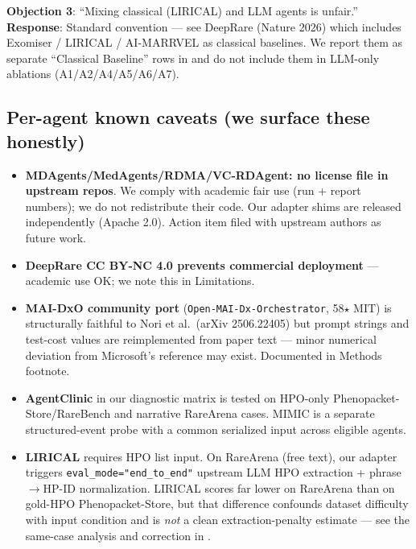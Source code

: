 \textbf{Objection 3}: ``Mixing classical (LIRICAL) and LLM agents is unfair.''
\textbf{Response}: Standard convention --- see DeepRare (Nature 2026) which includes Exomiser / LIRICAL / AI-MARRVEL as classical baselines. We report them as separate ``Classical Baseline'' rows in  and do not include them in LLM-only ablations (A1/A2/A4/A5/A6/A7).

\subsection{Per-agent known caveats (we surface these honestly)}\label{per-agent-known-caveats-we-surface-these-honestly}

\begin{itemize}
\tightlist
\item
  \textbf{MDAgents/MedAgents/RDMA/VC-RDAgent: no license file in upstream repos}. We comply with academic fair use (run + report numbers); we do not redistribute their code. Our adapter shims are released independently (Apache 2.0). Action item filed with upstream authors as future work.
\item
  \textbf{DeepRare CC BY-NC 4.0 prevents commercial deployment} --- academic use OK; we note this in Limitations.
\item
  \textbf{MAI-DxO community port} (\texttt{Open-MAI-Dx-Orchestrator}, 58\ensuremath{\star} MIT) is structurally faithful to Nori et al.~(arXiv 2506.22405) but prompt strings and test-cost values are reimplemented from paper text --- minor numerical deviation from Microsoft's reference may exist. Documented in Methods footnote.
\item
  \textbf{AgentClinic} in our diagnostic matrix is tested on HPO-only
  Phenopacket-Store/RareBench and narrative RareArena cases. MIMIC is a separate
  structured-event probe with a common serialized input across eligible agents.
\item
  \textbf{LIRICAL} requires HPO list input. On RareArena (free text), our adapter triggers \texttt{eval\_mode="end\_to\_end"} upstream LLM HPO extraction + phrase\ensuremath{\rightarrow}HP-ID normalization. LIRICAL scores far lower on RareArena than on gold-HPO Phenopacket-Store, but that difference confounds dataset difficulty with input condition and is \emph{not} a clean extraction-penalty estimate --- see the same-case analysis and correction in .
\end{itemize}

